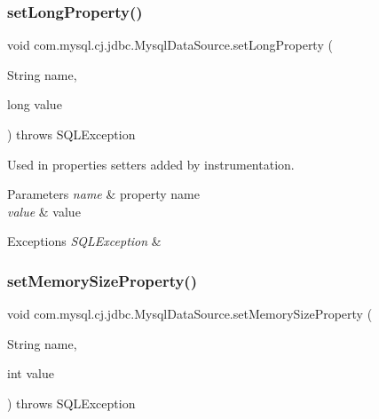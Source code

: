 \subsubsection{\texorpdfstring{set\+Long\+Property()}{setLongProperty()}}
{\footnotesize\ttfamily void com.\+mysql.\+cj.\+jdbc.\+Mysql\+Data\+Source.\+set\+Long\+Property (\begin{DoxyParamCaption}\item[{String}]{name,  }\item[{long}]{value }\end{DoxyParamCaption}) throws S\+Q\+L\+Exception\hspace{0.3cm}{\ttfamily [protected]}}

Used in properties setters added by instrumentation.


\begin{DoxyParams}{Parameters}
{\em name} & property name \\
\hline
{\em value} & value \\
\hline
\end{DoxyParams}

\begin{DoxyExceptions}{Exceptions}
{\em S\+Q\+L\+Exception} & \\
\hline
\end{DoxyExceptions}
\mbox{\label{classcom_1_1mysql_1_1cj_1_1jdbc_1_1_mysql_data_source_aed210876accef1c6217580a80e5f506b}} 
\subsubsection{\texorpdfstring{set\+Memory\+Size\+Property()}{setMemorySizeProperty()}}
{\footnotesize\ttfamily void com.\+mysql.\+cj.\+jdbc.\+Mysql\+Data\+Source.\+set\+Memory\+Size\+Property (\begin{DoxyParamCaption}\item[{String}]{name,  }\item[{int}]{value }\end{DoxyParamCaption}) throws S\+Q\+L\+Exception\hspace{0.3cm}{\ttfamily [protected]}}

